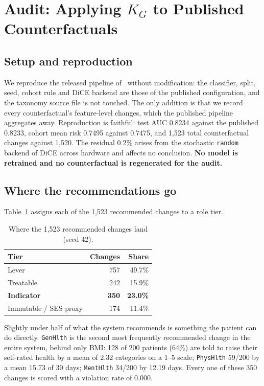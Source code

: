 \documentclass[conference]{IEEEtran}
\begin{document}
\section{Audit: Applying $K_G$ to Published Counterfactuals}
\subsection{Setup and reproduction}
We reproduce the released pipeline of~\cite{thieu2026} without modification: the classifier, split, seed, cohort rule and DiCE backend are those of the published configuration, and the taxonomy source file is not touched. The only addition is that we record every counterfactual's feature-level changes, which the published pipeline aggregates away. Reproduction is faithful: test AUC 0.8234 against the published 0.8233, cohort mean risk 0.7495 against 0.7475, and 1{,}523 total counterfactual changes against 1{,}520. The residual 0.2\% arises from the stochastic \texttt{random} backend of DiCE across hardware and affects no conclusion. \textbf{No model is retrained and no counterfactual is regenerated for the audit.}

\subsection{Where the recommendations go}
Table~\ref{tab:audit} assigns each of the 1{,}523 recommended changes to a role tier.

\begin{table}[t]
\caption{Where the 1{,}523 recommended changes land (seed 42).}
\label{tab:audit}
\centering
\footnotesize
\begin{tabular}{@{}lrr@{}}
\toprule
\textbf{Tier} & \textbf{Changes} & \textbf{Share} \\
\midrule
Lever & 757 & 49.7\% \\
Treatable & 242 & 15.9\% \\
\textbf{Indicator} & \textbf{350} & \textbf{23.0\%} \\
Immutable / SES proxy & 174 & 11.4\% \\
\bottomrule
\end{tabular}
\end{table}

Slightly under half of what the system recommends is something the patient can do directly. \texttt{GenHlth} is the second most frequently recommended change in the entire system, behind only BMI: 128 of 200 patients (64\%) are told to raise their self-rated health by a mean of 2.32 categories on a 1--5 scale; \texttt{PhysHlth} 59/200 by a mean 15.73 of 30 days; \texttt{MentHlth} 34/200 by 12.19 days. Every one of these 350 changes is scored with a violation rate of 0.000.
\end{document}
